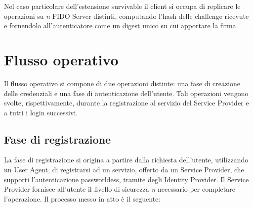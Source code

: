 Nel caso particolare dell'estensione survivable il client si occupa di replicare le operazioni su \emph{n} FIDO Server distinti, computando l'hash delle challenge ricevute e fornendolo all'autenticatore come un digest unico su cui apportare la firma. 

\section{Flusso operativo}
\label{flusso_operativo}

Il flusso operativo si compone di due operazioni distinte: una fase di creazione delle credenziali e una fase di autenticazione dell'utente. Tali operazioni vengono svolte, rispettivamente, durante la registrazione al servizio del Service Provider e a tutti i login successivi.

\subsection{Fase di registrazione}
\label{registrazione}

La fase di registrazione si origina a partire dalla richiesta dell'utente, utilizzando un User Agent, di registrarsi ad un servizio, offerto da un Service Provider, che supporti l'autenticazione passworldess, tramite degli Identity Provider. Il Service Provider fornisce all'utente il livello di sicurezza \emph{n} necessario per completare l'operazione. Il processo messo in atto è il seguente:

